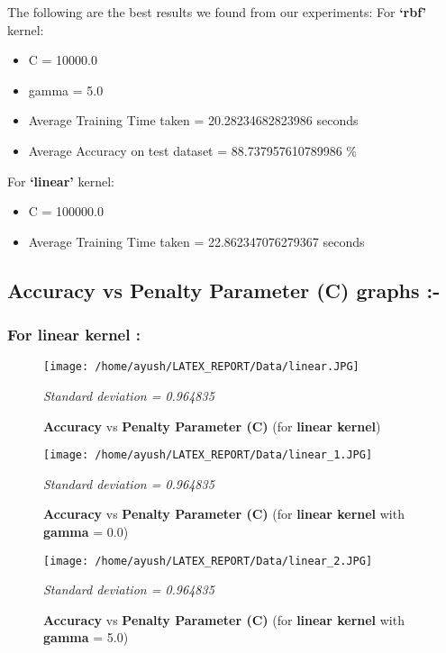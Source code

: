 \documentclass{report}
\begin{document}
\begin{multicols}{2}
The following are the best results we found from our experiments:
For \textbf{‘rbf’} kernel:
\begin{itemize}
\item C = 10000.0
\item gamma = 5.0
\item Average Training Time taken = 20.28234682823986 seconds
\item Average Accuracy on test dataset = 88.737957610789986 \%
\end{itemize}
For \textbf{‘linear’} kernel:
\begin{itemize}
\item C = 100000.0
\item Average Training Time taken = 22.862347076279367 seconds
\end{itemize}
\end{multicols}
\pagebreak
\subsection{\textbf \Large {Accuracy }vs\textbf{ Penalty Parameter (C) graphs :-}}
\subsubsection{\textbf \Large  {For linear kernel :}}
\begin{figure}[!h]
  \texttt{[image: /home/ayush/LATEX\_REPORT/Data/linear.JPG]}
  \caption{\textbf{Accuracy }vs\textbf{ Penalty Parameter (C)} (for \textbf{linear kernel})}
  \label{fig:}
\emph{\normalsize Standard deviation = 0.964835}
\end{figure}

\begin{figure}[!h]
  \texttt{[image: /home/ayush/LATEX\_REPORT/Data/linear\_1.JPG]}
  \caption{\textbf{Accuracy }vs\textbf{ Penalty Parameter (C)} (for \textbf{linear kernel} with \textbf{gamma} = 0.0)}
  \label{fig:}
  \emph{\normalsize Standard deviation = 0.964835}
\end{figure}

\pagebreak
\begin{figure}[!h]
  \texttt{[image: /home/ayush/LATEX\_REPORT/Data/linear\_2.JPG]}
  \caption{\textbf{Accuracy }vs\textbf{ Penalty Parameter (C)} (for \textbf{linear kernel} with \textbf{gamma} = 5.0)}
  \label{fig:}
  \emph{\normalsize Standard deviation = 0.964835}
\end{figure}
\end{document}
